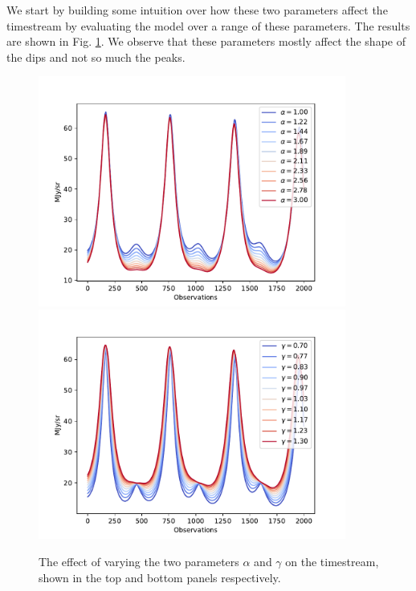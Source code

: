 \documentclass{article}
\begin{document}
We start by building some intuition over how these two parameters affect the timestream by evaluating the model over a range of these parameters. The results are shown in Fig. \ref{fig:params}. We observe that these parameters mostly affect the shape of the dips and not so much the peaks.
\begin{figure}
    \centering
    \includegraphics[width=0.9\textwidth]{figs/alpha.pdf}
    \includegraphics[width=0.9\textwidth]{figs/gamma.pdf}
    \caption{The effect of varying the two parameters $\alpha$ and $\gamma$ on the timestream, shown in the top and bottom panels respectively.}
    \label{fig:params}
\end{figure}
\end{document}
